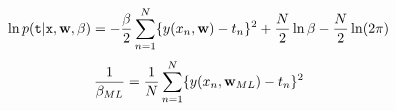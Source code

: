 $$\ln p({\tt t}|{\tt x},{\bf w},\beta)=-\frac{\beta}{2}\sum_{n=1}^{N}\{y(x_n , {\bf w})-t_n \}^2 + \frac{N}{2}\ln \beta - \frac{N}{2}\ln (2\pi)$$
$$\frac{1}{\beta_{ML}} = \frac{1}{N}\sum_{n=1}^{N}\{y(x_n , {\bf w}_{ML})-t_n \}^2$$
